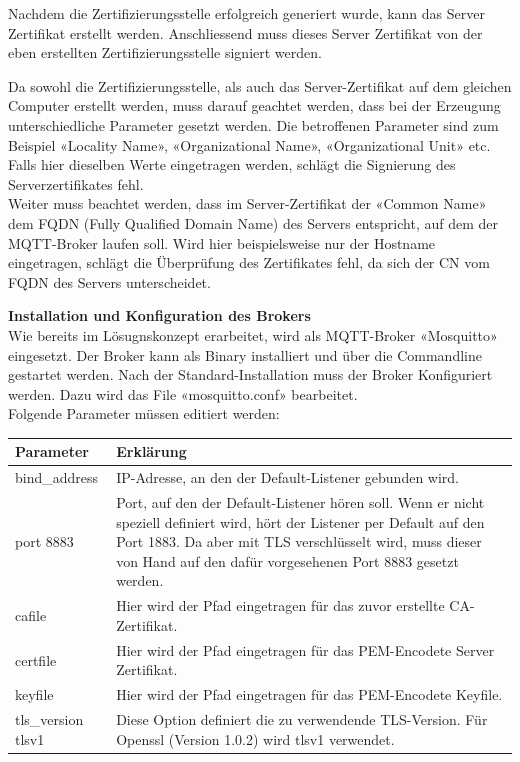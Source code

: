 Nachdem die Zertifizierungsstelle erfolgreich generiert wurde, kann das Server Zertifikat erstellt werden. Anschliessend muss dieses Server Zertifikat von der eben erstellten Zertifizierungsstelle signiert werden.

Da sowohl die Zertifizierungsstelle, als auch das Server-Zertifikat auf dem gleichen Computer erstellt werden, muss darauf geachtet werden, dass bei der Erzeugung unterschiedliche Parameter gesetzt werden. Die betroffenen Parameter sind zum Beispiel «Locality Name», «Organizational Name», «Organizational Unit» etc. Falls hier dieselben Werte eingetragen werden, schlägt die Signierung des Serverzertifikates fehl. \\
Weiter muss beachtet werden, dass im Server-Zertifikat der «Common Name» dem FQDN (Fully Qualified Domain Name) des Servers entspricht, auf dem der MQTT-Broker laufen soll. Wird hier beispielsweise nur der Hostname eingetragen, schlägt die Überprüfung des Zertifikates fehl, da sich der CN vom FQDN des Servers unterscheidet.

\textbf{Installation und Konfiguration des Brokers} \\
Wie bereits im Lösugnskonzept erarbeitet, wird als MQTT-Broker «Mosquitto» eingesetzt. Der Broker kann als Binary installiert und über die Commandline gestartet werden.
Nach der Standard-Installation muss der Broker Konfiguriert werden. Dazu wird das File «mosquitto.conf» bearbeitet.
\\Folgende Parameter müssen editiert werden:

\begin{tabularx}{\textwidth}{lX}
		\textbf{Parameter} & \textbf{Erklärung}
		\\ \hline
			bind\_address \tbd &
			IP-Adresse, an den der Default-Listener gebunden wird.
		\\ \hline
			port 8883 &
			Port, auf den der Default-Listener hören soll. Wenn er nicht speziell definiert wird, hört der Listener per Default auf den Port 1883. Da aber mit TLS verschlüsselt wird, muss dieser von Hand auf den dafür vorgesehenen Port 8883 gesetzt werden.
		\\ \hline
			cafile \tbd &
			Hier wird der Pfad eingetragen für das zuvor erstellte CA-Zertifikat.
		\\ \hline
			certfile \tbd &
			Hier wird der Pfad eingetragen für das PEM-Encodete Server Zertifikat.
		\\ \hline
			keyfile \tbd &
			Hier wird der Pfad eingetragen für das PEM-Encodete Keyfile.
		\\ \hline
			tls\_version tlsv1 &
			Diese Option definiert die zu verwendende TLS-Version. Für Openssl (Version 1.0.2) wird tlsv1 verwendet.
		\\ \hline
\end{tabularx}

